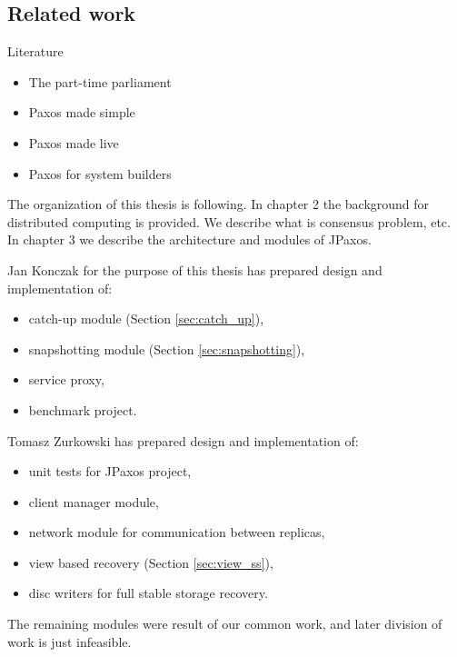 \begin{TODO}

\section{Related work}
Literature

\begin{itemize}
  \item The part-time parliament
  \item Paxos made simple
  \item Paxos made live
  \item Paxos for system builders
\end{itemize}

\end{TODO}

\begin{TODO}
The organization of this thesis is following. In chapter 2 the background for distributed computing is provided. We describe what is consensus problem, etc. In chapter 3 we describe the architecture and modules of JPaxos.
\end{TODO}

Jan Konczak for the purpose of this thesis has prepared design and implementation of:
\begin{itemize}
  \item catch-up module (Section \ref{sec:catch_up}),
  \item snapshotting module (Section \ref{sec:snapshotting}),
  \item service proxy,
  \item benchmark project.
\end{itemize}

Tomasz Zurkowski has prepared design and implementation of:
\begin{itemize}
  \item unit tests for JPaxos project,
  \item client manager module, 
  \item network module for communication between replicas,
  \item view based recovery (Section \ref{sec:view_ss}),
  \item disc writers for full stable storage recovery.
\end{itemize}

The remaining modules were result of our common work, and later division of work is just infeasible.
